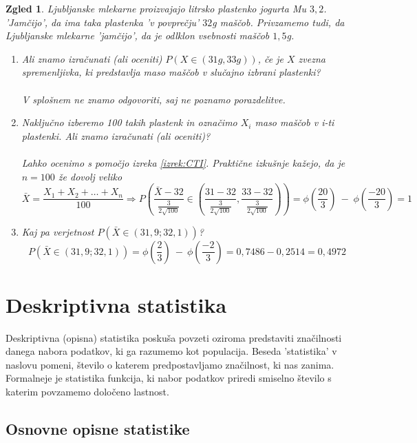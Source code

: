 \documentclass[11pt]{article}
\newtheorem{Zgled}[Izrek]{{\sc Zgled}}
\begin{document}
\begin{Zgled}
	\textnormal{Ljubljanske mlekarne proizvajajo litrsko plastenko jogurta Mu $3,2$. 'Jamčijo', da ima taka plastenka 'v povprečju' $32$g maščob. Privzamemo tudi, da Ljubljanske mlekarne 'jamčijo', da je odlklon vsebnosti maščob $1,5$g.}
	\\
	\begin{enumerate}
		\item
		Ali znamo izračunati (ali oceniti) $P(X\in (31g, 33g))$, če je $X$ zvezna spremenljivka, ki predstavlja maso maščob v slučajno izbrani plastenki?
		\\
		\\
		\textnormal{V splošnem ne znamo odgovoriti, saj ne poznamo porazdelitve.}
		\item
		Naključno izberemo 100 takih plastenk in označimo $X_i$ maso maščob v i-ti plastenki. Ali znamo izračunati (ali oceniti)?
		\\
		\\
		\textnormal{Lahko ocenimo s pomočjo izreka} \ref{izrek:CTI}. \textnormal{Praktične izkušnje kažejo, da je $n= 100$ že dovolj veliko}
		\\
		$$\bar{X} = \frac{X_1 + X_2 + \ldots + X_n}{100} \Rightarrow P\left(\frac{\bar{X} - 32}{\frac{3}{2\sqrt{100}}} \in \left( \frac{31 -32}{\frac{3}{2\sqrt{100}}}, \frac{33 - 32}{\frac{3}{2\sqrt{100}}} \right)   \right) = \phi\left(\frac{20}{3}\right) \ - \;  \phi \left(\frac{-20}{3}\right) = 1 $$
		\item
		Kaj pa verjetnost $P(\bar{X} \in (31{,}9 ; 32{,}1))$? 
		\\
		$$ P(\bar{X} \in (31{,}9 ; 32{,}1)) = \phi\left(\frac{2}{3}\right) \ - \ \phi \left(\frac{-2}{3}\right) = 0,7486 - 0,2514 = 0,4972$$
	\end{enumerate}
\end{Zgled}
\section{Deskriptivna statistika}
	Deskriptivna (opisna) statistika poskuša povzeti oziroma predstaviti značilnosti danega nabora podatkov, ki ga razumemo kot populacija. Beseda 'statistika' v naslovu pomeni, število o katerem predpostavljamo značilnost, ki nas zanima. Formalneje je statistika funkcija, ki nabor podatkov priredi smiselno število s katerim povzamemo določeno lastnost.
\subsection{Osnovne opisne statistike}
\end{document}
